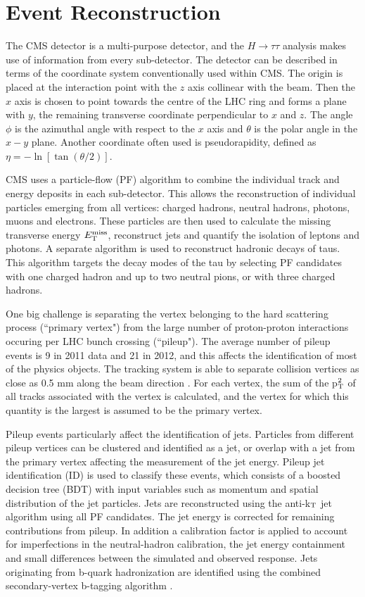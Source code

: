 \chapter{Event Reconstruction}
\label{chap:reco}
The CMS detector is a multi-purpose detector, and the $H\rightarrow\tau\tau$
analysis makes use of information from every sub-detector. The detector can be
described in terms of the coordinate system conventionally used within CMS. The
origin is placed at the interaction point with the $z$ axis collinear with the
beam. Then the $x$ axis is chosen to point towards the centre of the LHC ring
and forms a plane with $y$, the remaining transverse coordinate perpendicular to
$x$ and $z$. The angle $\phi$ is the azimuthal angle with respect to the $x$
axis and $\theta$ is the polar angle in the $x-y$ plane. Another coordinate
often used is pseudorapidity, defined as $\eta = - \ln[\tan(\theta/2)]$. 

CMS uses a particle-flow (PF)  algorithm \cite{CMS-PAS-PFT-09-001} to combine
the individual track and energy deposits in each sub-detector. This allows the
reconstruction of individual particles emerging from all vertices: charged
hadrons, neutral hadrons, photons, muons and electrons. These particles are then
used to calculate the missing transverse energy $E_{\rm{T}}^{\rm{miss}}$,
reconstruct jets and quantify the isolation of leptons and photons. A separate
algorithm is used to reconstruct hadronic decays of taus. This algorithm targets
the decay modes of the tau by selecting PF candidates with one charged hadron
and up to two neutral pions, or with three charged hadrons.

One big challenge is separating the vertex belonging to the hard scattering
process (``primary vertex") from the large number of proton-proton interactions
occuring per LHC bunch crossing (``pileup"). The average number of pileup events
is 9 in 2011 data and 21 in 2012, and this affects the identification of most of
the physics objects. The tracking system is able to separate collision vertices
as close as 0.5 mm along the beam direction \cite{clustering}. For each vertex,
the sum of the p$_{\rm{T}}^{2}$ of all tracks associated with the vertex is
calculated, and the vertex for which this quantity is the largest is assumed to
be the primary vertex.

Pileup events particularly affect the identification of jets. Particles from
different pileup vertices can be clustered and identified as a jet, or overlap
with a jet from the primary vertex affecting the measurement of the jet energy.
Pileup jet identification (ID) is used to classify these events, which consists
of a boosted decision tree (BDT) \cite{TMVA} with input variables such as
momentum and spatial distribution of the jet particles. Jets are reconstructed
using the anti-k$_{\rm{T}}$ jet algorithm \cite{antikt} using all PF candidates.
The jet energy is corrected for remaining contributions from pileup. In addition
a calibration factor is applied to account for imperfections in the
neutral-hadron calibration, the jet energy containment and small differences
between the simulated and observed response. Jets originating from b-quark
hadronization are identified using the combined secondary-vertex b-tagging
algorithm \cite{bjets}.

